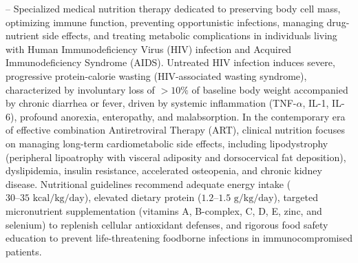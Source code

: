 -- Specialized medical nutrition therapy dedicated to preserving body cell mass, optimizing immune function, preventing opportunistic infections, managing drug-nutrient side effects, and treating metabolic complications in individuals living with Human Immunodeficiency Virus (HIV) infection and Acquired Immunodeficiency Syndrome (AIDS). Untreated HIV infection induces severe, progressive protein-calorie wasting (HIV-associated wasting syndrome), characterized by involuntary loss of $>10\%$ of baseline body weight accompanied by chronic diarrhea or fever, driven by systemic inflammation (TNF-$\alpha$, IL-1, IL-6), profound anorexia, enteropathy, and malabsorption. In the contemporary era of effective combination Antiretroviral Therapy (ART), clinical nutrition focuses on managing long-term cardiometabolic side effects, including lipodystrophy (peripheral lipoatrophy with visceral adiposity and dorsocervical fat deposition), dyslipidemia, insulin resistance, accelerated osteopenia, and chronic kidney disease. Nutritional guidelines recommend adequate energy intake ($30\text{--}35\text{ kcal/kg/day}$), elevated dietary protein ($1.2\text{--}1.5\text{ g/kg/day}$), targeted micronutrient supplementation (vitamins A, B-complex, C, D, E, zinc, and selenium) to replenish cellular antioxidant defenses, and rigorous food safety education to prevent life-threatening foodborne infections in immunocompromised patients.

